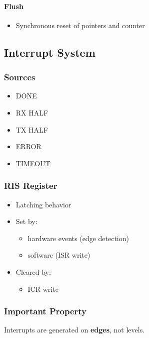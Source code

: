 \paragraph{Flush}
\begin{itemize}
  \item Synchronous reset of pointers and counter
\end{itemize}

\subsection{Interrupt System}

\subsubsection{Sources}

\begin{itemize}
  \item DONE
  \item RX HALF
  \item TX HALF
  \item ERROR
  \item TIMEOUT
\end{itemize}

\subsubsection{RIS Register}

\begin{itemize}
  \item Latching behavior
  \item Set by:
    \begin{itemize}
      \item hardware events (edge detection)
      \item software (ISR write)
    \end{itemize}
  \item Cleared by:
    \begin{itemize}
      \item ICR write
    \end{itemize}
\end{itemize}

\subsubsection{Important Property}

Interrupts are generated on \textbf{edges}, not levels.

